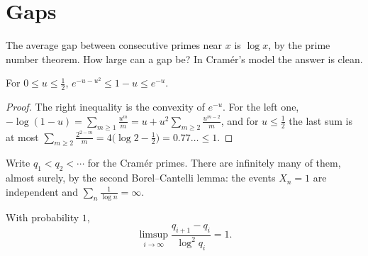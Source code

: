 \section{Gaps}

The average gap between consecutive primes near $x$ is $\log x$, by the prime number theorem. How large can a gap be? In Cramér's model the answer is clean.

\begin{lemma}\label{lem:oneminus}
For $0\le u\le\frac12$, $e^{-u-u^2}\le1-u\le e^{-u}$.
\end{lemma}

\begin{proof}
The right inequality is the convexity of $e^{-u}$. For the left one, $-\log(1-u)=\sum_{m\ge1}\frac{u^m}m=u+u^2\sum_{m\ge2}\frac{u^{m-2}}m$, and for $u\le\frac12$ the last sum is at most
$\sum_{m\ge2}\frac{2^{2-m}}m=4\bigl(\log2-\frac12\bigr)=0.77\ldots\le1$.
\end{proof}

Write $q_1<q_2<\cdots$ for the Cramér primes. There are infinitely many of them, almost surely, by the second Borel--Cantelli lemma: the events $X_n=1$ are independent and
$\sum_n\frac1{\log n}=\infty$.

\begin{theorem}[Cramér, 1936]\label{thm:cramergaps}
With probability $1$,
\[
\limsup_{i\to\infty}\frac{q_{i+1}-q_i}{\log^2q_i}=1.
\]
\end{theorem}

